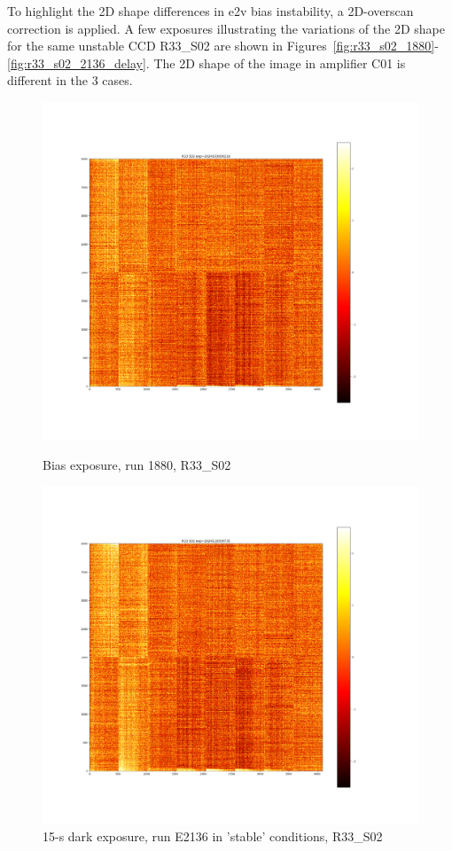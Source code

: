 To highlight the 2D shape differences in e2v bias instability, a 2D-overscan correction
is applied. A few exposures illustrating the variations of the 2D shape
for the same unstable CCD R33\_S02 are shown in Figures~\ref{fig:r33_s02_1880}-\ref{fig:r33_s02_2136_delay}. The 2D shape of the image in
amplifier C01 is different in the 3 cases.

\begin{figure}[htbp]
\centering
\begin{minipage}{0.45\textwidth}
    \centering
    \includegraphics[width=\textwidth]{sections/figures/E1880_bias_R33_S02.png}
    \caption{Bias exposure, run 1880, R33\_S02}
    \label{fig:r33_s02_1880}
\end{minipage}
\hfill
\begin{minipage}{0.45\textwidth}
    \centering
    \includegraphics[width=\textwidth]{sections/figures/E2136_dark15_R33_S02.png}
    \caption{15-s dark exposure, run E2136 in 'stable' conditions, R33\_S02}
    \label{fig:r33_s02_2136}
\end{minipage}


\end{figure}

